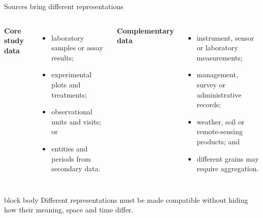 \documentclass[10pt,aspectratio=169]{beamer}
\begin{document}
\begin{frame}{Sources bring different representations}

\small

\begin{columns}[T]


\textbf{Core study data}

\begin{itemize}
  \item laboratory samples or assay results;
  \item experimental plots and treatments;
  \item observational units and visits; or
  \item entities and periods from secondary data.
\end{itemize}


\textbf{Complementary data}

\begin{itemize}
  \item instrument, sensor or laboratory measurements;
  \item management, survey or administrative records;
  \item weather, soil or remote-sensing products; and
  \item different grains may require aggregation.
\end{itemize}

\end{columns}

\vspace{0.35cm}

\begin{beamercolorbox}[rounded=true,sep=8pt]{block body}
Different representations must be made compatible without hiding how their meaning, space and time differ.
\end{beamercolorbox}

\end{frame}
\end{document}
